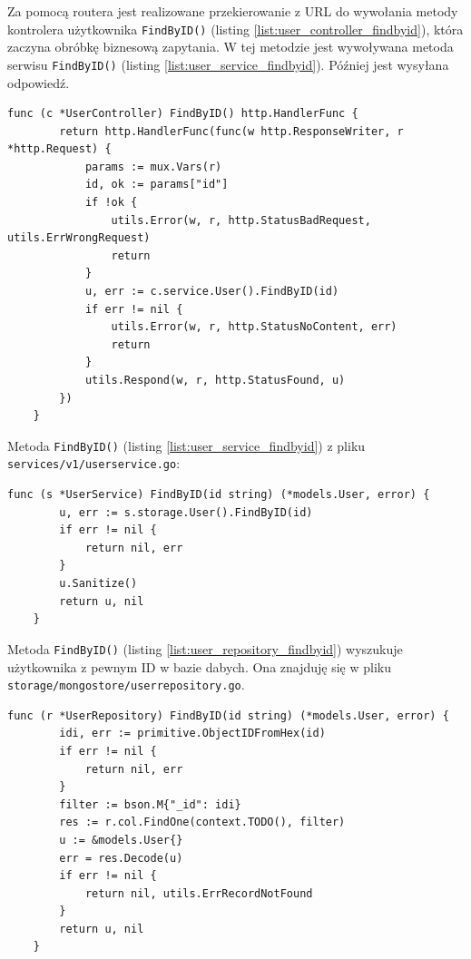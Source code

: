 Za pomocą routera jest realizowane przekierowanie z URL do wywołania metody kontrolera użytkownika \texttt{FindByID()} (listing \ref{list:user_controller_findbyid}), która zaczyna obróbkę biznesową zapytania.
W tej metodzie jest wywoływana metoda serwisu \texttt{FindByID()} (listing \ref{list:user_service_findbyid}). Później jest wysyłana odpowiedź.
\begin{lstlisting}[label=list:user_controller_findbyid,caption=Kontroler wczytywania użytkownika,basicstyle=\tiny\ttfamily]
    func (c *UserController) FindByID() http.HandlerFunc {
        return http.HandlerFunc(func(w http.ResponseWriter, r *http.Request) {
            params := mux.Vars(r)
            id, ok := params["id"]
            if !ok {
                utils.Error(w, r, http.StatusBadRequest, utils.ErrWrongRequest)
                return
            }
            u, err := c.service.User().FindByID(id)
            if err != nil {
                utils.Error(w, r, http.StatusNoContent, err)
                return
            }
            utils.Respond(w, r, http.StatusFound, u)
        })
    }
\end{lstlisting}
% 
Metoda \texttt{FindByID()} (listing \ref{list:user_service_findbyid}) z pliku \texttt{services/v1/userservice.go}:
\begin{lstlisting}[label=list:user_service_findbyid,caption=Serwis wczytywania użytkownika,basicstyle=\tiny\ttfamily]
    func (s *UserService) FindByID(id string) (*models.User, error) {
        u, err := s.storage.User().FindByID(id)
        if err != nil {
            return nil, err
        }
        u.Sanitize()
        return u, nil
    }
\end{lstlisting}
% 
Metoda \texttt{FindByID()} (listing \ref{list:user_repository_findbyid}) wyszukuje użytkownika z pewnym ID w bazie dabych.
Ona znajduję się w pliku \texttt{storage/mongostore/userrepository.go}.
\begin{lstlisting}[label=list:user_repository_findbyid,caption=Wczytywanie uzytkownika z bazy danych,basicstyle=\tiny\ttfamily]
    func (r *UserRepository) FindByID(id string) (*models.User, error) {
        idi, err := primitive.ObjectIDFromHex(id)
        if err != nil {
            return nil, err
        }
        filter := bson.M{"_id": idi}
        res := r.col.FindOne(context.TODO(), filter)
        u := &models.User{}
        err = res.Decode(u)
        if err != nil {
            return nil, utils.ErrRecordNotFound
        }
        return u, nil
    }
\end{lstlisting}

